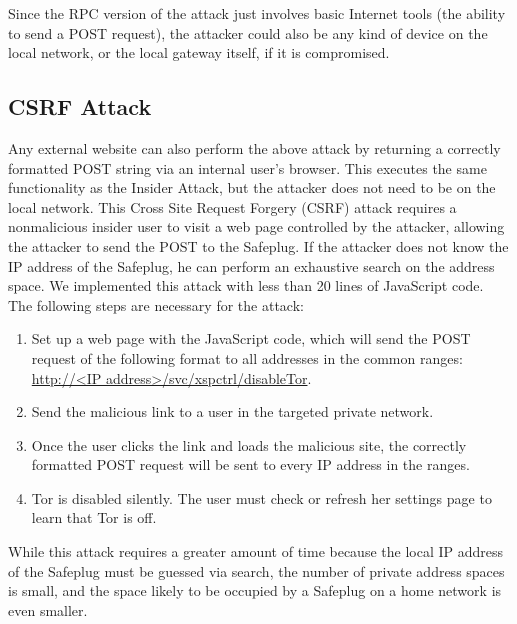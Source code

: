\documentclass[letterpaper,twocolumn,10pt]{article}
\begin{document}
Since the RPC version of the attack just involves basic Internet tools (the ability to send a POST request), the attacker could also be any kind of device on the local network, or the local gateway itself, if it is compromised.

\subsection{CSRF Attack}
Any external website can also perform the above attack by returning a correctly formatted POST string via an internal user's browser.  This executes the same functionality as the Insider Attack, but the attacker does not need to be on the local network.  This Cross Site Request Forgery (CSRF) attack requires a nonmalicious insider user to visit a web page controlled by the attacker, allowing the attacker to send the POST to the Safeplug.  If the attacker does not know the IP address of the Safeplug, he can perform an exhaustive search on the address space.  We implemented this attack with less than 20 lines of JavaScript code.  The following steps are necessary for the attack:

\begin{enumerate} \setlength{\itemsep}{.2mm}
\item Set up a web page with the JavaScript code, which will send the POST request of the following format to all addresses in the common ranges: \url{http://<IP address>/svc/xspctrl/disableTor}.
\item Send the malicious link to a user in the targeted private network.
\item Once the user clicks the link and loads the malicious site, the correctly formatted POST request will be sent to every IP address in the ranges.  
\item Tor is disabled silently.  The user must check or refresh her settings page to learn that Tor is off.  
\end{enumerate}  

While this attack requires a greater amount of time because the local IP address of the Safeplug must be guessed via search, the number of private address spaces is small, and the space likely to be occupied by a Safeplug on a home network is even smaller.  
\end{document}
